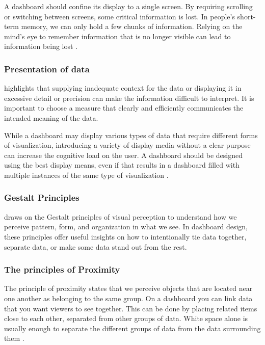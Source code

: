A dashboard should confine its display to a single screen. By requiring scrolling or switching between screens, some critical information is lost. In people's short-term memory, we can only hold a few chunks of information. Relying on the mind’s eye to remember information that is no longer visible can lead to information being lost \autocite[p. 39-40]{FewDashboard}.

\subsubsection{Presentation of data}
\label{subsubsec:presentation_of_data}


\textcite{FewDashboard} highlights that supplying inadequate context for the data or displaying it in excessive detail or precision can make the information difficult to interpret. It is important to choose a measure that clearly and efficiently communicates the intended meaning of the data.

While a dashboard may display various types of data that require different forms of visualization, introducing a variety of display media without a clear purpose can increase the cognitive load on the user. A dashboard should be designed using the best display means, even if that results in a dashboard filled with multiple instances of the same type of visualization \autocite[p. 50-51]{FewDashboard}.

\subsubsection{Gestalt Principles}
\label{subsubsec:gestalt_principles}


\textcite{FewDashboard} draws on the Gestalt principles of visual perception to understand how we perceive pattern, form, and organization in what we see. In dashboard design, these principles offer useful insights on how to intentionally tie data together, separate data, or make some data stand out from the rest.

\subsubsection{The principles of Proximity}
\label{subsubsec:principle_proximity}


The principle of proximity states that we perceive objects that are located near one another as belonging to the same group. On a dashboard you can link data that you want viewers to see together. This can be done by placing related items close to each other, separated from other groups of data. White space alone is usually enough to separate the different groups of data from the data surrounding them \autocite[p. 75]{FewDashboard}.

